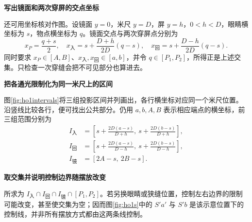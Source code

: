 \begin{solution}
\par\medskip{}\noindent\textbf{写出镜面和两次穿屏的交点坐标}\par\nobreak
还可用坐标核对作图。设镜面 $y=0$，米尺 $y=D$，屏 $y=h$，$0<h<D$，眼睛横坐标为 $s$，物点横坐标为 $q$。镜面交点与两次穿屏点分别为
\[
x_P=\frac{q+s}{2},\quad
x_{\text{入}}=s+\frac{D+h}{2D}(q-s),\quad
x_{\text{回}}=s+\frac{D-h}{2D}(q-s).
\]
同时要求 $x_P\in[A,B]$、$x_{\text{入}},x_{\text{回}}\in[a,b]$，并令 $q\in[P_1,P_2]$，所得正是上述交集。只检查一次穿缝会把不可见部分也算进去。



\par\medskip{}\noindent\textbf{把各通光限制化为同一米尺上的区间}\par\nobreak
图\ref{fig:ho1intervals}将三组投影区间并列画出，各行横坐标对应同一个米尺位置。沿竖线比较各行，便可找出公共部分。仍用 $a,b,A,B$ 表示相应端点的横坐标，前三组范围分别为
\begin{align*}
I_{\text{入}}&=\left[s+\frac{2D(a-s)}{D+h},\ s+\frac{2D(b-s)}{D+h}\right],\\
I_{\text{回}}&=\left[s+\frac{2D(a-s)}{D-h},\ s+\frac{2D(b-s)}{D-h}\right],\\
I_{\text{镜}}&=[2A-s,\ 2B-s].
\end{align*}


\par\medskip{}\noindent\textbf{取交集并说明控制边界随摆放改变}\par\nobreak
所求为 $I_{\text{入}}\cap I_{\text{回}}\cap I_{\text{镜}}\cap[P_1,P_2]$。若另换眼睛或狭缝位置，控制左右边界的限制可能改变，甚至使交集为空；因而图\ref{fig:ho1s}中的 $S'a'$ 与 $S'b$ 是该示意位置下的控制线，并非所有摆放方式都由这两条线控制。

\end{solution}

